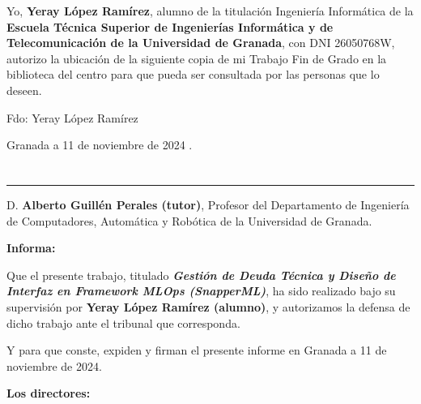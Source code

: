 \vspace{1.3cm}

Yo, \textbf{Yeray López Ramírez}, alumno de la titulación Ingeniería Informática de la \textbf{Escuela Técnica Superior
       de Ingenierías Informática y de Telecomunicación de la Universidad de Granada}, con DNI 26050768W, autorizo la
ubicación de la siguiente copia de mi Trabajo Fin de Grado en la biblioteca del centro para que pueda ser
consultada por las personas que lo deseen.

\vspace{6cm}

\noindent Fdo: Yeray López Ramírez

\vspace{2cm}

\begin{flushright}
       Granada a 11 de noviembre de 2024 .
\end{flushright}


\chapter*{}
\thispagestyle{empty}

\noindent\rule[-1ex]{\textwidth}{2pt}

\vspace{1.2cm}

D. \textbf{Alberto Guillén Perales (tutor)}, Profesor del Departamento de Ingeniería de Computadores, Automática y Robótica de la Universidad de Granada.

\vspace{0.5cm}

\textbf{Informa:}

\vspace{0.5cm}

Que el presente trabajo, titulado \textit{\textbf{Gestión de Deuda Técnica y Diseño de Interfaz en Framework MLOps (SnapperML)}},
ha sido realizado bajo su supervisión por \textbf{Yeray López Ramírez (alumno)}, y autorizamos la defensa de dicho trabajo ante el tribunal
que corresponda.

\vspace{0.5cm}

Y para que conste, expiden y firman el presente informe en Granada a 11 de noviembre de 2024.

\vspace{1cm}

\textbf{Los directores:}

\vspace{5cm}

